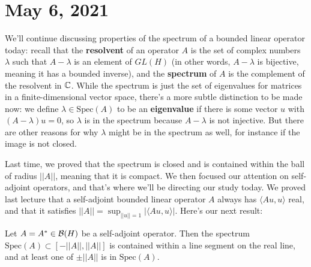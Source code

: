 \pagebreak\section{May 6, 2021}

We'll continue discussing properties of the spectrum of a bounded linear operator today: recall that the \textbf{resolvent} of an operator $A$ is the set of complex numbers $\lambda$ such that $A - \lambda$ is an element of $GL(H)$ (in other words, $A - \lambda$ is bijective, meaning it has a bounded inverse), and the \textbf{spectrum} of $A$ is the complement of the resolvent in $\mathbb C$. While the spectrum is just the set of eigenvalues for matrices in a finite-dimensional vector space, there's a more subtle distinction to be made now: we define $\lambda \in \text{Spec}(A)$ to be an \textbf{eigenvalue} if there is some vector $u$ with $(A - \lambda)u = 0$, so $\lambda$ is in the spectrum because $A - \lambda$ is not injective. But there are other reasons for why $\lambda$ might be in the spectrum as well, for instance if the image is not closed. 

Last time, we proved that the spectrum is closed and is contained within the ball of radius $||A||$, meaning that it is compact. We then focused our attention on self-adjoint operators, and that's where we'll be directing our study today. We proved last lecture that a self-adjoint bounded linear operator $A$ always has $\langle Au, u \rangle$ real, and that it satisfies $||A|| = \sup_{||u|| = 1} |\langle Au, u \rangle|$. Here's our next result:

\begin{theorem}\label{spectrumisinrealline}
Let $A = A^\ast \in \mathcal{B}(H)$ be a self-adjoint operator. Then the spectrum $\text{Spec}(A) \subset [-||A||, ||A||]$ is contained within a line segment on the real line, and at least one of $\pm ||A||$ is in $\text{Spec}(A)$.
\end{theorem}

